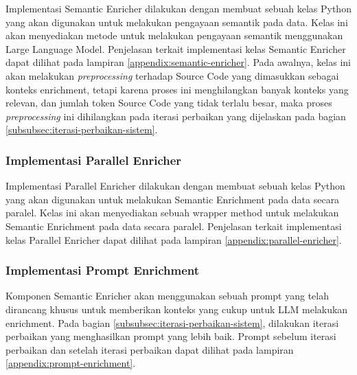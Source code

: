 Implementasi Semantic Enricher dilakukan dengan membuat sebuah kelas Python yang akan digunakan untuk melakukan pengayaan semantik pada data. Kelas ini akan menyediakan metode untuk melakukan pengayaan semantik menggunakan Large Language Model. Penjelasan terkait implementasi kelas Semantic Enricher dapat dilihat pada lampiran \ref{appendix:semantic-enricher}. Pada awalnya, kelas ini akan melakukan \textit{preprocessing} terhadap Source Code yang dimasukkan sebagai konteks enrichment, tetapi karena proses ini menghilangkan banyak konteks yang relevan, dan jumlah token Source Code yang tidak terlalu besar, maka proses \textit{preprocessing} ini dihilangkan pada iterasi perbaikan yang dijelaskan pada bagian \ref{subsubsec:iterasi-perbaikan-sistem}. 

\subsubsection{Implementasi Parallel Enricher}

Implementasi Parallel Enricher dilakukan dengan membuat sebuah kelas Python yang akan digunakan untuk melakukan Semantic Enrichment pada data secara paralel. Kelas ini akan menyediakan sebuah wrapper method untuk melakukan Semantic Enrichment pada data secara paralel. Penjelasan terkait implementasi kelas Parallel Enricher dapat dilihat pada lampiran \ref{appendix:parallel-enricher}.

\subsubsection{Implementasi Prompt Enrichment}

Komponen Semantic Enricher akan menggunakan sebuah prompt yang telah dirancang khusus untuk memberikan konteks yang cukup untuk LLM melakukan enrichment. Pada bagian \ref{subsubsec:iterasi-perbaikan-sistem}, dilakukan iterasi perbaikan yang menghasilkan prompt yang lebih baik. Prompt sebelum iterasi perbaikan dan setelah iterasi perbaikan dapat dilihat pada lampiran \ref{appendix:prompt-enrichment}.



